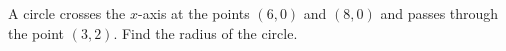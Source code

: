 A circle crosses the $x$-axis at the points $(6,0)$ and $(8,0)$ and passes through the point $(3,2)$. Find the radius of the circle.
